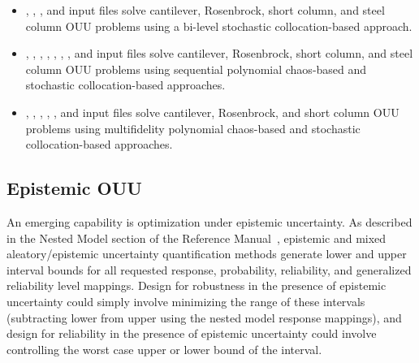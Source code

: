 \begin{itemize}
\item {},
  ,
  , and
   input files solve cantilever,
  Rosenbrock, short column, and steel column OUU problems using a
  bi-level stochastic collocation-based approach.

\item {},
  ,
  ,
  ,
  ,
  ,
  , and
   input files solve
  cantilever, Rosenbrock, short column, and steel column OUU problems
  using sequential polynomial chaos-based and stochastic
  collocation-based approaches.

\item {},
  ,
  ,
  ,
  , and
   input files solve cantilever,
  Rosenbrock, and short column OUU problems using multifidelity
  polynomial chaos-based and stochastic collocation-based approaches.
\end{itemize}


\subsection{Epistemic OUU} \label{adv_models:ouu:epistemic}

An emerging capability is optimization under epistemic uncertainty.
As described in the Nested Model section of the Reference
Manual~\cite{RefMan}, epistemic and mixed aleatory/epistemic
uncertainty quantification methods generate lower and upper interval
bounds for all requested response, probability, reliability, and
generalized reliability level mappings. Design for robustness in the
presence of epistemic uncertainty could simply involve minimizing the
range of these intervals (subtracting lower from upper using the
nested model response mappings), and design for reliability in the
presence of epistemic uncertainty could involve controlling the worst
case upper or lower bound of the interval.

